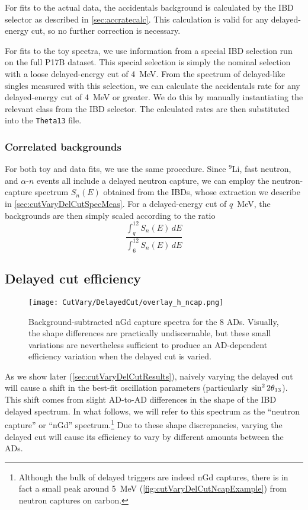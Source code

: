 \documentclass[../thesis.tex]{subfiles}
\begin{document}
For fits to the actual data, the accidentals background is calculated by the IBD selector as described in \autoref{sec:accratecalc}. This calculation is valid for any delayed-energy cut, so no further correction is necessary.

For fits to the toy spectra, we use information from a special IBD selection run on the full P17B dataset. This special selection is simply the nominal selection with a loose delayed-energy cut of 4~MeV. From the spectrum of delayed-like singles measured with this selection, we can calculate the accidentals rate for any delayed-energy cut of 4~MeV or greater. We do this by manually instantiating the relevant class from the IBD selector. The calculated rates are then substituted into the \texttt{Theta13} file.

\subsubsection{Correlated backgrounds}

For both toy and data fits, we use the same procedure. Since $^9$Li, fast neutron, and $\alpha$-$n$ events all include a delayed neutron capture, we can employ the neutron-capture spectrum $S_n(E)$ obtained from the IBDs, whose extraction we describe in \autoref{sec:cutVaryDelCutSpecMeas}. For a delayed-energy cut of $q$~MeV, the backgrounds are then simply scaled according to the ratio
\begin{equation}
  \label{eq:cutVaryDelCutCorrBkgScale}
  \frac{\int_q^{12} S_n(E)\,dE}{\int_6^{12} S_n(E)\,dE}
\end{equation}

\subsection{Delayed cut efficiency}
\label{sec:cutVaryDelCutEff}

\begin{figure}[ht]
  \texttt{[image: CutVary/DelayedCut/overlay\_h\_ncap.png]}
  \caption{Background-subtracted nGd capture spectra for the 8 ADs. Visually, the shape differences are practically undiscernable, but these small variations are nevertheless sufficient to produce an AD-dependent efficiency variation when the delayed cut is varied.}
  \label{fig:cutVaryDelCutSpecOverlay}
\end{figure}

As we show later (\autoref{sec:cutVaryDelCutResults}), naively varying the delayed cut will cause a shift in the best-fit oscillation parameters (particularly $\sin^2 2\theta_{13}$). This shift comes from slight AD-to-AD differences in the shape of the IBD delayed spectrum. In what follows, we will refer to this spectrum as the ``neutron capture'' or ``nGd'' spectrum.\footnote{Although the bulk of delayed triggers are indeed nGd captures, there is in fact a small peak around 5~MeV (\autoref{fig:cutVaryDelCutNcapExample}) from neutron captures on carbon.} Due to these shape discrepancies, varying the delayed cut will cause its efficiency to vary by different amounts between the ADs.
\end{document}
